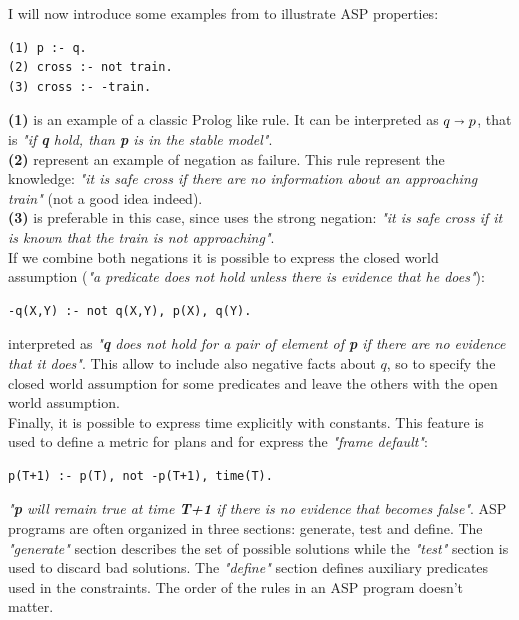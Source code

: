 \documentclass[pdftex,12pt,a4paper]{report}
\begin{document}
\noindent I will now introduce some examples from \cite{lifschitz2008answer}%
to illustrate ASP properties:
\begin{verbatim}
(1) p :- q.
(2) cross :- not train.
(3) cross :- -train.
\end{verbatim}
\textbf{(1)} is an example of a classic Prolog like rule. It can be interpreted as $q \shortrightarrow p$, that is \textit{"if \textbf{q} hold, than \textbf{p} is in the stable model"}. 
\\\noindent \textbf{(2)} represent an example of negation as failure. This rule represent the knowledge: \textit{"it is safe cross if there are no information about an approaching train"} (not a good idea indeed).
\\\noindent \textbf{(3)} is preferable in this case, since uses the strong negation: \textit{"it is safe cross if it is known that the train is not approaching"}.
\\\noindent If we combine both negations it is possible to express the closed world assumption (\textit{"a predicate does not hold unless there is evidence that he does"}):
\begin{verbatim}
-q(X,Y) :- not q(X,Y), p(X), q(Y).
\end{verbatim}
interpreted as \textit{"\textbf{q} does not hold for a pair of element of \textbf{p} if there are no evidence that it does"}. This allow to include also negative facts about $q$, so to specify the closed world assumption for some predicates and leave the others with the open world assumption.
\\\noindent Finally, it is possible to express time explicitly with constants. This feature is used to define a metric for plans and for express the \textit{"frame default"}:
\begin{verbatim}
p(T+1) :- p(T), not -p(T+1), time(T).
\end{verbatim}
\textit{"\textbf{p} will remain true at time \textbf{T+1} if there is no evidence that becomes false"}.
\noindent ASP programs are often organized in three sections: generate, test and define. The \textit{"generate"} section describes the set of possible solutions while the \textit{"test"} section is used to discard bad solutions. The \textit{"define"} section defines auxiliary predicates used in the constraints. The order of the rules in an ASP program doesn't matter.
\newline
\end{document}
